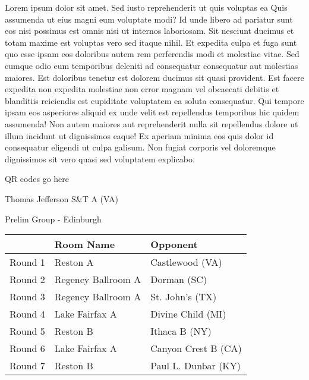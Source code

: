 \documentclass{article}%
\begin{document}
\vspace*{8pt}%
\linebreak%
\newline%
\newline%
Lorem ipsum dolor sit amet. Sed iusto reprehenderit ut quis voluptas ea Quis assumenda ut eius magni eum voluptate modi? Id unde libero ad pariatur sunt eos nisi possimus est omnis nisi ut internos laboriosam. Sit nesciunt ducimus et totam maxime est voluptas vero sed itaque nihil. Et expedita culpa et fuga sunt quo esse ipsam eos doloribus autem rem perferendis modi et molestiae vitae.\newline%
\newline%
Sed cumque odio eum temporibus deleniti ad consequatur consequatur aut molestias maiores. Est doloribus tenetur est dolorem ducimus sit quasi provident. Est facere expedita non expedita molestiae non error magnam vel obcaecati debitis et blanditiis reiciendis est cupiditate voluptatem ea soluta consequatur. Qui tempore ipsam eos asperiores aliquid ex unde velit est repellendus temporibus hic quidem assumenda!\newline%
\newline%
Non autem maiores aut reprehenderit nulla sit repellendus dolore ut illum incidunt ut dignissimos eaque! Ex aperiam minima eos quis dolor id consequatur eligendi ut culpa galisum. Non fugiat corporis vel doloremque dignissimos sit vero quasi sed voluptatem explicabo.\newline%
\newline%
%
\vspace*{30pt}%
\begin{center}%
\begin{Huge}%
QR codes go here%
\end{Huge}%
\end{center}%
\newpage%
%
\begin{center}%
\begin{Huge}%
Thomas Jefferson S\&T A (VA)%
\end{Huge}%
\vspace*{8pt}%
\linebreak%
\begin{Large}%
Prelim Group {-} Edinburgh%
\end{Large}%
\end{center}%
\begin{tabularx}{\textwidth}{|c|Y|Y|}%
\hline%
&Room Name&Opponent\\%
\hline%
Round 1&Reston A&Castlewood (VA)\\%
Round 2&Regency Ballroom A&Dorman (SC)\\%
Round 3&Regency Ballroom A&St. John's (TX)\\%
Round 4&Lake Fairfax A&Divine Child (MI)\\%
Round 5&Reston B&Ithaca B (NY)\\%
Round 6&Lake Fairfax A&Canyon Crest B (CA)\\%
Round 7&Reston B&Paul L. Dunbar (KY)\\%
\hline%
\end{tabularx}%
\end{document}
